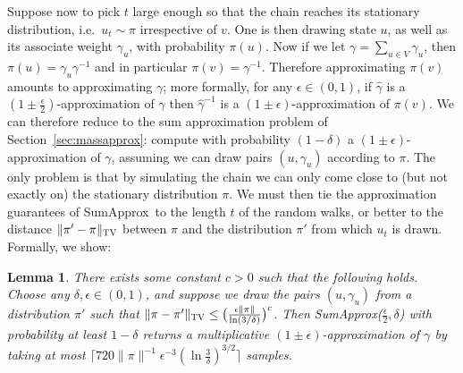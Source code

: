 \documentclass[a4paper,11pt]{article}
\newcommand{\tvd}[2]{\| {#1 - #2} \|_\textsc{TV}}
\newcommand{\sumest}{SumApprox}
\newtheorem{lemma}[theorem]{Lemma}
\begin{document}
Suppose now to pick $t$ large enough so that the chain reaches its stationary distribution, i.e.\ $u_t \sim \pi$ irrespective of $v$.
One is then drawing state $u$, as well as its associate weight $\gamma_{u}$, with probability $\pi(u)$.
Now if we let $\gamma = \sum_{u \in V} \gamma_u$, then $\pi(u) = \gamma_u \gamma^{-1}$ and in particular $\pi(v) = \gamma^{-1}$.
Therefore approximating $\pi(v)$ amounts to approximating $\gamma$; more formally, for any $\epsilon \in (0,1)$, if $\hat{\gamma}$ is a $(1\pm\frac{\epsilon}{2})$-approximation of $\gamma$ then $\hat{\gamma}^{-1}$ is a $(1\pm \epsilon)$-approximation of $\pi(v)$.
We can therefore reduce to the sum approximation problem of Section~\ref{sec:massapprox}: compute with probability $(1-\delta)$ a $(1\pm\epsilon)$-approximation of $\gamma$, assuming we can draw pairs $(u,\gamma_u)$ according to $\pi$.
The only problem is that by simulating the chain we can only come close to (but not exactly on) the stationary distribution $\pi$.
We must then tie the approximation guarantees of \sumest\ to the length $t$ of the random walks, or better to the distance $\tvd{\pi'}{\pi}$ between $\pi$ and the distribution $\pi'$ from which $u_t$ is drawn.
Formally, we show:
\begin{lemma}
\label{lem:adapt}
There exists some constant $c > 0$ such that the following holds.
Choose any ${\delta,\epsilon \in (0,1)}$, and suppose we draw the pairs $(u,\gamma_u)$ from a distribution $\pi'$ such that $\tvd{\pi}{\pi'} \le \big(\frac{\epsilon \|\pi\|}{\ln(3/\delta)}\big)^c$.
Then \sumest($\frac{\epsilon}{2},\delta$) with probability at least $1-\delta$ returns a multiplicative $(1\pm \epsilon)$-approximation of $\gamma$ by taking at most $\lceil 720 \|\pi\|^{-1} \epsilon^{-3}(\ln{\frac{3}{\delta}})^{3/2} \rceil$ samples.
\end{lemma}
\end{document}
